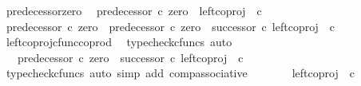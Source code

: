 \begin{isabellebody}
\isanewline
{}\isamarkupfalse%
%
\endisatagproof
{\isafoldproof}%
%
\isadelimproof
\isanewline
%
\endisadelimproof
\isanewline
{}\isamarkupfalse%
\ predecessor{\isacharprime}{\kern0pt}{\isacharunderscore}{\kern0pt}zero{\isacharcolon}{\kern0pt}\isanewline
\ \ {\isachardoublequoteopen}predecessor{\isacharprime}{\kern0pt}\ {\isasymcirc}\isactrlsub c\ zero\ {\isacharequal}{\kern0pt}\ left{\isacharunderscore}{\kern0pt}coproj\ {\isasymone}\ {\isasymnat}\isactrlsub c{\isachardoublequoteclose}\isanewline
%
\isadelimproof
%
\endisadelimproof
%
\isatagproof
{}\isamarkupfalse%
\ {\isacharminus}{\kern0pt}\isanewline
\ \ \isamarkupfalse%
\ {\isachardoublequoteopen}predecessor{\isacharprime}{\kern0pt}\ {\isasymcirc}\isactrlsub c\ zero\ {\isacharequal}{\kern0pt}\ predecessor{\isacharprime}{\kern0pt}\ {\isasymcirc}\isactrlsub c\ {\isacharparenleft}{\kern0pt}zero\ {\isasymamalg}\ successor{\isacharparenright}{\kern0pt}\ {\isasymcirc}\isactrlsub c\ left{\isacharunderscore}{\kern0pt}coproj\ {\isasymone}\ {\isasymnat}\isactrlsub c{\isachardoublequoteclose}\isanewline
\ \ \ \ \isamarkupfalse%
\ left{\isacharunderscore}{\kern0pt}coproj{\isacharunderscore}{\kern0pt}cfunc{\isacharunderscore}{\kern0pt}coprod\ \isamarkupfalse%
\ {\isacharparenleft}{\kern0pt}typecheck{\isacharunderscore}{\kern0pt}cfuncs{\isacharcomma}{\kern0pt}\ auto{\isacharparenright}{\kern0pt}\isanewline
\ \ \isamarkupfalse%
\ \isamarkupfalse%
\ {\isachardoublequoteopen}{\isachardot}{\kern0pt}{\isachardot}{\kern0pt}{\isachardot}{\kern0pt}\ {\isacharequal}{\kern0pt}\ {\isacharparenleft}{\kern0pt}predecessor{\isacharprime}{\kern0pt}\ {\isasymcirc}\isactrlsub c\ {\isacharparenleft}{\kern0pt}zero\ {\isasymamalg}\ successor{\isacharparenright}{\kern0pt}{\isacharparenright}{\kern0pt}\ {\isasymcirc}\isactrlsub c\ left{\isacharunderscore}{\kern0pt}coproj\ {\isasymone}\ {\isasymnat}\isactrlsub c{\isachardoublequoteclose}\isanewline
\ \ \ \ \isamarkupfalse%
\ {\isacharparenleft}{\kern0pt}typecheck{\isacharunderscore}{\kern0pt}cfuncs{\isacharcomma}{\kern0pt}\ auto\ simp\ add{\isacharcolon}{\kern0pt}\ comp{\isacharunderscore}{\kern0pt}associative{}{\isacharparenright}{\kern0pt}\isanewline
\ \ \isamarkupfalse%
\ \isamarkupfalse%
\ {\isachardoublequoteopen}{\isachardot}{\kern0pt}{\isachardot}{\kern0pt}{\isachardot}{\kern0pt}\ {\isacharequal}{\kern0pt}\ left{\isacharunderscore}{\kern0pt}coproj\ {\isasymone}\ {\isasymnat}\isactrlsub c{\isachardoublequoteclose}\isanewline

\end{isabellebody}
